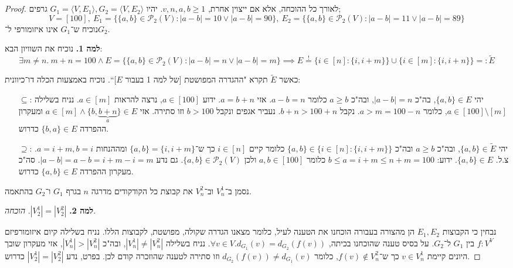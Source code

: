 \documentclass[]{article}
\newcommand\ps    {\mathcal{P}}
\newcommand\ra    {\rangle}
\newcommand\la    {\langle}
\newcommand\seq   {\overset{!}{=}}
\newcommand\tl    {\tilde}
\begin{document}
	\section{}
	\begin{proof}
		לאורך כל ההוכחה, אלא אם ייצוין אחרת, $v, n, a, b \ge 1$. 
		יהיו $G_1 = \la V, E_1 \ra, G_2 = \la V, E_2 \ra$ גרפים;
		\[ V = [100], \ E_1 = \{\{a, b\} \in \ps_2(V) \colon |a - b| = 10 \lor |a - b| = 90\}, \ E_2 = \{\{a, b\} \in \ps_2(V) \colon |a - b| = 11 \lor |a - b| = 89\} \]
		נוכיח ש־$G_1$ אינו איזומורפי ל־$G_2$. 
		
		\textbf{למה 1. }נוכיח את השוויון הבא: 
		\[ \exists m \neq n. \ m + n = 100 \land E = \{\{a, b\} \in \ps_2(V) \colon |a - b| = n \lor |a - b| = m\} \!\!\implies\!\! E \seq \{i \in [n] \colon \{i, i + m\}\} \cup \{i \in [m] \colon \{i, i + n\}\} =: \tl E \]
		
		כאשר $\tl E$ תקרא "ההגדרה המפושטת [של למה 1 בעבור $E$]``. 
		נוכיח באמצעות הכלה דו־כיוונית: 
		\begin{itemize}
			\item[$\subseteq$:] יהי $\{a, b\} \in E$, בה"כ $|a - b| = n$, ובה"כ $a \ge b$ כלומר $a - b = n$. אזי $a = b + n$. ידוע $a \in [100]$, נרצה להראות $a \in [m]$. נניח בשלילה $a \in [100] \setminus [m]$, כלומר $a > m = 100 - n$. נקבל $b + n > 100 + n$. נעביר אגפים ונקבל $b > 100$ וזו סתירה. אזי $a \in [m] \land \{b, \underbrace{b + n}_{a}\} \in E$ ומעקרון ההפרדה $\{b, a\} \in E$ כדרוש. 
			\item[$\supseteq$:] יהי $\{a, b\} \in \tl E$, ובה"כ $a \ge b$ ובה"כ $\{a, b\} \in \{i \in [n] \colon \{i, i + m\}\}$ כלומר קיים $i \in [n]$ כך ש־$\{a, b\} = \{i, i + m\}$ ומההנחות $a = i + m, b = i$. צ.ל. $\{a, b\} \in E$. ידוע: $b \le a = i + m \le n + m = 100$ כלומר $a, b \in [100]$ ולכן $\{a, b\} \in \ps_2(V)$. גם נדע $|a - b| = a - b = i + m - i = m$. סה"כ מעקרון ההפרדה $\{a, b\} \in E$ כדרוש. 
		\end{itemize}
		
		נסמן ב־$V_n^1$ וב־$V_n^2$ את קבוצת כל הקודקודים מדרגה $n$ בגרף $G_1$ ו־$G_2$ בהתאמה. 
		
		\textbf{למה 2. }$|V_2^1| = |V_2^2|$. \textit{הוכחה.}
		
		נבחין כי הקבוצות $E_1, E_2$ הן מהצורה בעבורה הוכחנו את הטענה לעיל, כלומר מצאנו הגדרה שקולה, מפושטת, לקבוצות הללו. נניח בשלילה קיום איזומורפיזם $f \colon V^V$ בין $G_1$ ל־$G_2$. על בסיס טענה שהוכחנו בכיתה, $\forall v \in V. d_{G_1}(v) = d_{G_2}(f(v))$. נניח בשלילה $|V_n^1| \neq |V_n^2|$, ובה"כ $|V_n^1| > |V_n^2|$, אזי מעקרון שובך היונים קיימת $v \in V_n^1$ כך ש־$f(v) \notin V_n^2$, כלומר $d_{G_2}(f(v)) \neq d_{G_1}(v)$ וזו סתירה לטענה שהוזכרה קודם לכן. בפרט, נדע $|V_2^1| = |V_2^2|$ כדרוש. 
		

\end{proof}
\end{document}

